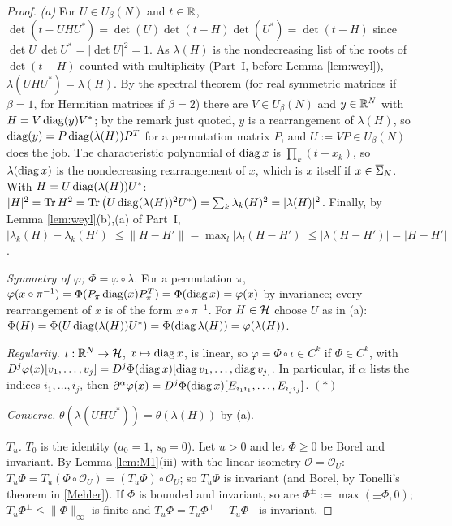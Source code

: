 \begin{proof}
\emph{(a)} For $U\in U_\beta(N)$ and $t\in\mathbb{R}$, $\det(t-UHU^*)=\det(U)\det(t-H)\det(U^*)=\det(t-H)$ since $\det U\,\det U^*=|\det U|^2=1$. As $\lambda(H)$ is the nondecreasing list of the roots of $\det(t-H)$ counted with multiplicity (Part~I, before Lemma \ref{lem:weyl}), $\lambda(UHU^*)=\lambda(H)$.
By the spectral theorem (for real symmetric matrices if $\beta=1$, for Hermitian matrices if $\beta=2$) there are $V\in U_\beta(N)$ and $y\in\mathbb{R}^N$ with $H=V\operatorname{diag}(y)V^*$; by the remark just quoted, $y$ is a rearrangement of $\lambda(H)$, so $\operatorname{diag}(y)=P\operatorname{diag}(\lambda(H))P^T$ for a permutation matrix $P$, and $U:=VP\in U_\beta(N)$ does the job.
The characteristic polynomial of $\operatorname{diag} x$ is $\prod_k(t-x_k)$, so $\lambda(\operatorname{diag} x)$ is the nondecreasing rearrangement of $x$, which is $x$ itself if $x\in\overline{\Sigma}_N$.
With $H=U\operatorname{diag}(\lambda(H))U^*$: $|H|^2=\operatorname{Tr} H^2=\operatorname{Tr}\big(U\operatorname{diag}(\lambda(H))^2U^*\big)=\sum_k\lambda_k(H)^2=|\lambda(H)|^2$.
Finally, by Lemma \ref{lem:weyl}(b),(a) of Part~I, $|\lambda_k(H)-\lambda_k(H')|\le\|H-H'\|=\max_l|\lambda_l(H-H')|\le|\lambda(H-H')|=|H-H'|$.

\emph{Symmetry of $\varphi$; $\Phi=\varphi\circ\lambda$.} For a permutation $\pi$, $\varphi(x\circ\pi^{-1})=\Phi(P_\pi\operatorname{diag}(x)P_\pi^T)=\Phi(\operatorname{diag} x)=\varphi(x)$ by invariance; every rearrangement of $x$ is of the form $x\circ\pi^{-1}$.
For $H\in\mathcal{H}$ choose $U$ as in (a): $\Phi(H)=\Phi(U\operatorname{diag}(\lambda(H))U^*)=\Phi(\operatorname{diag}\lambda(H))=\varphi(\lambda(H))$.

\emph{Regularity.} $\iota:\mathbb{R}^N\to\mathcal{H}$, $x\mapsto\operatorname{diag} x$, is linear, so $\varphi=\Phi\circ\iota\in C^k$ if $\Phi\in C^k$, with
$D^j\varphi(x)[v_1,\dots,v_j]=D^j\Phi(\operatorname{diag} x)[\operatorname{diag} v_1,\dots,\operatorname{diag} v_j]$. In particular, if $\alpha$ lists the indices $i_1,\dots,i_j$, then $\partial^\alpha\varphi(x)=D^j\Phi(\operatorname{diag} x)[E_{i_1i_1},\dots,E_{i_ji_j}]$. \hfill$(\ast)$

\emph{Converse.} $\theta(\lambda(UHU^*))=\theta(\lambda(H))$ by (a).

\emph{$T_u$.} $T_0$ is the identity ($a_0=1$, $s_0=0$). Let $u>0$ and let $\Phi\ge0$ be Borel and invariant. By Lemma \ref{lem:M1}(iii) with the linear isometry $\mathcal O=\mathcal O_U$:
$T_u\Phi=T_u(\Phi\circ\mathcal O_U)=(T_u\Phi)\circ\mathcal O_U$; so $T_u\Phi$ is invariant (and Borel, by Tonelli's theorem in \eqref{Mehler}). If $\Phi$ is bounded and invariant, so are $\Phi^\pm:=\max(\pm\Phi,0)$; $T_u\Phi^\pm\le\|\Phi\|_\infty$ is finite and $T_u\Phi=T_u\Phi^+-T_u\Phi^-$ is invariant.


\end{proof}
